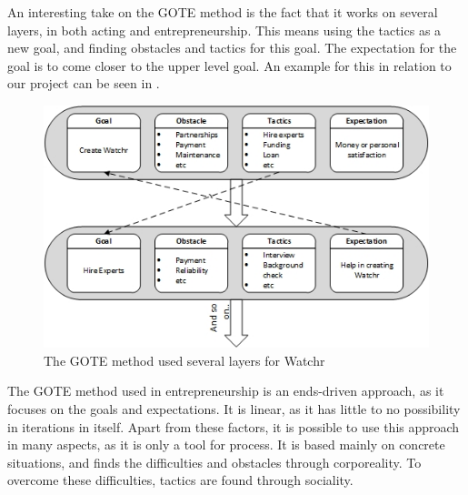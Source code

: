 An interesting take on the GOTE method is the fact that it works on several layers, in both acting and entrepreneurship. This means using the tactics as a new goal, and finding obstacles and tactics for this goal. The expectation for the goal is to come closer to the upper level goal. An example for this in relation to our project can be seen in .

\begin{figure}[h]
\begin{center}
\includegraphics[scale=1]{./pics/gote_watchr}
\caption{The GOTE method used several layers for Watchr}
\label{fig:gote_watchr}
\end{center}
\end{figure}

The GOTE method used in entrepreneurship is an ends-driven approach, as it focuses on the goals and expectations. It is linear, as it has little to no possibility in iterations in itself. Apart from these factors, it is possible to use this approach in many aspects, as it is only a tool for process. It is based mainly on concrete situations, and finds the difficulties and obstacles through corporeality. To overcome these difficulties, tactics are found through sociality.